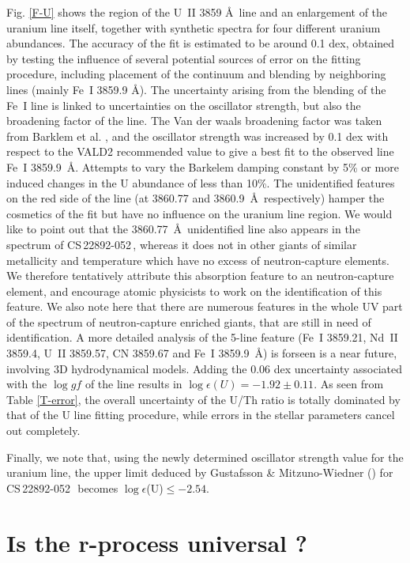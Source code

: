 \documentclass{aa}
\def\sned{CS\,22892-052\,}
\begin{document}
Fig. \ref{F-U} shows the region of the
U~II 3859 \AA\ line and an enlargement of the uranium line itself, together
with synthetic spectra for four different uranium abundances.  The accuracy of 
the fit is estimated to be around 0.1 dex, obtained by testing the influence 
of several potential sources of error on the fitting procedure, including 
placement of the continuum and blending by neighboring lines (mainly Fe~I
3859.9 \AA). The uncertainty arising from the blending of
the Fe~I line is linked to uncertainties on the oscillator strength,
but also the broadening factor of the line. The Van der waals
broadening factor was taken from Barklem et al. \cite{barklem2}, and the
oscillator strength was increased by 0.1 dex with respect to the VALD2
recommended value to give
a best fit to the observed line Fe~I 3859.9~\AA. 
Attempts to vary the Barkelem damping constant by 5\% or more induced
changes in the U abundance of less than 10\%. The unidentified 
features on the red side of the line (at 3860.77 and 3860.9~\AA\
respectively) hamper the cosmetics of the fit but have no influence on the uranium line region. We would like to
point out that the 3860.77~\AA\ unidentified line also appears in the
spectrum of \sned, whereas
it does not in other giants of similar metallicity and temperature
which have no excess of neutron-capture elements. We
therefore tentatively attribute this absorption feature to an
neutron-capture element, and encourage atomic physicists to work on
the identification of this feature. We also note here that there are
numerous features in the whole UV part of the spectrum of
neutron-capture enriched giants, that are still in need of identification.
A more detailed analysis of the 5-line feature (Fe~I 3859.21, 
Nd~II 3859.4, U~II 3859.57, CN 3859.67 and Fe~I 3859.9~\AA) 
is forseen is a near future, involving 3D hydrodynamical models.
Adding the 0.06 dex uncertainty associated with the $\log gf$ of
the line results in $\log \epsilon(U)=-1.92\pm 0.11$. 
As seen from Table \ref{T-error}, the overall uncertainty of the U/Th ratio is 
totally dominated by that of the U line fitting procedure, while errors in the 
stellar parameters cancel out completely.

Finally, we note that, using the newly determined oscillator strength value for 
the uranium line, the upper limit deduced by Gustafsson \& Mitzuno-Wiedner
(\cite{gustafsson01}) for \sned\, becomes $\log \epsilon$(U)$\leq -2.54$.

\section {Is the r-process universal ?} \label{r universal}
\end{document}
